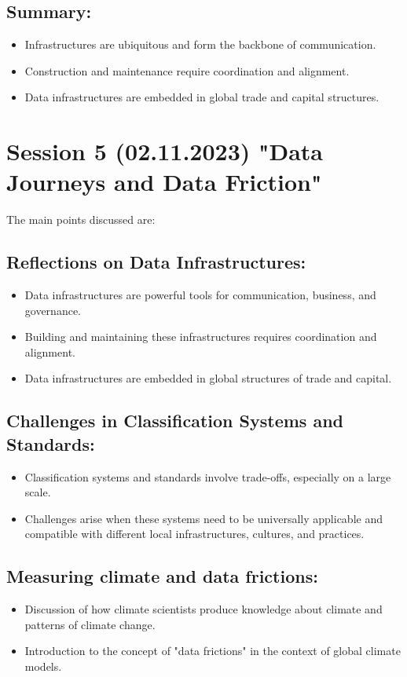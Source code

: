 \documentclass{article}
\begin{document}
\subsection*{Summary:}
\begin{itemize}
    \item Infrastructures are ubiquitous and form the backbone of communication.
    \item Construction and maintenance require coordination and alignment.
    \item Data infrastructures are embedded in global trade and capital structures.
\end{itemize}


\section*{Session 5 (02.11.2023) "Data Journeys and Data Friction"}
The main points discussed are:

\subsection*{Reflections on Data Infrastructures:}
\begin{itemize}
    \item Data infrastructures are powerful tools for communication, business, and governance.
    \item Building and maintaining these infrastructures requires coordination and alignment.
    \item Data infrastructures are embedded in global structures of trade and capital.
\end{itemize}

\subsection*{Challenges in Classification Systems and Standards:}
\begin{itemize}
    \item Classification systems and standards involve trade-offs, especially on a large scale.
    \item Challenges arise when these systems need to be universally applicable and compatible with different local infrastructures, cultures, and practices.
\end{itemize}

\subsection*{Measuring climate and data frictions:}
\begin{itemize}
    \item Discussion of how climate scientists produce knowledge about climate and patterns of climate change.
    \item Introduction to the concept of "data frictions" in the context of global climate models.
\end{itemize}
\end{document}
